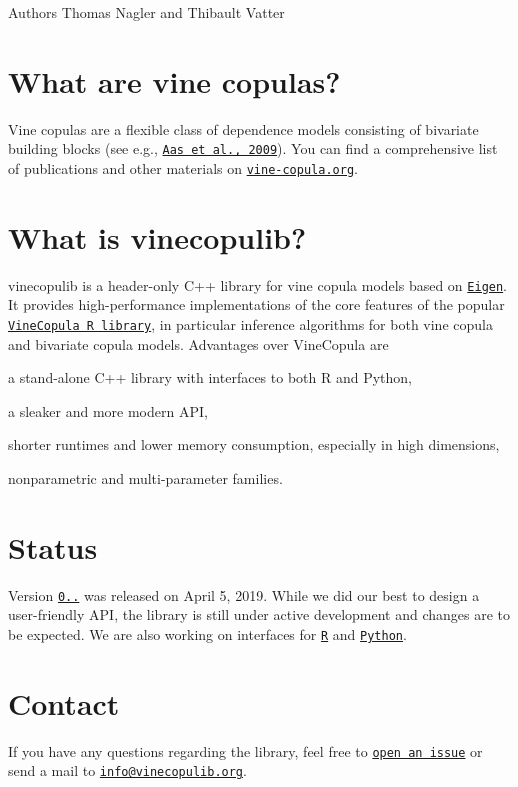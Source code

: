 \begin{DoxyAuthor}{Authors}
Thomas Nagler and Thibault Vatter
\end{DoxyAuthor}
\hypertarget{index_what-vc}{}\section{What are vine copulas?}\label{index_what-vc}
Vine copulas are a flexible class of dependence models consisting of bivariate building blocks (see e.\+g., \href{https://mediatum.ub.tum.de/doc/1083600/1083600.pdf}{\tt Aas et al., 2009}). You can find a comprehensive list of publications and other materials on \href{http://www.statistics.ma.tum.de/en/research/vine-copula-models/}{\tt vine-\/copula.\+org}.\hypertarget{index_what-vcl}{}\section{What is vinecopulib?}\label{index_what-vcl}
vinecopulib is a header-\/only C++ library for vine copula models based on \href{http://eigen.tuxfamily.org/index.php?title=Main_Page}{\tt Eigen}. It provides high-\/performance implementations of the core features of the popular \href{https://github.com/tnagler/VineCopula}{\tt Vine\+Copula R library}, in particular inference algorithms for both vine copula and bivariate copula models. Advantages over Vine\+Copula are
\begin{DoxyItemize}
\item a stand-\/alone C++ library with interfaces to both R and Python,
\item a sleaker and more modern A\+PI,
\item shorter runtimes and lower memory consumption, especially in high dimensions,
\item nonparametric and multi-\/parameter families.
\end{DoxyItemize}\hypertarget{index_Status}{}\section{Status}\label{index_Status}
Version \href{https://github.com/vinecopulib/vinecopulib/releases}{\tt 0..} was released on April 5, 2019. While we did our best to design a user-\/friendly A\+PI, the library is still under active development and changes are to be expected. We are also working on interfaces for \href{https://github.com/vinecopulib/rvinecopulib}{\tt R} and \href{https://github.com/vinecopulib/pyvinecopulib}{\tt Python}.\hypertarget{index_Contact}{}\section{Contact}\label{index_Contact}
If you have any questions regarding the library, feel free to \href{https://github.com/vinecopulib/vinecopulib/issues/new}{\tt open an issue} or send a mail to \href{mailto:info@vinecopulib.org}{\tt info@vinecopulib.\+org}. 